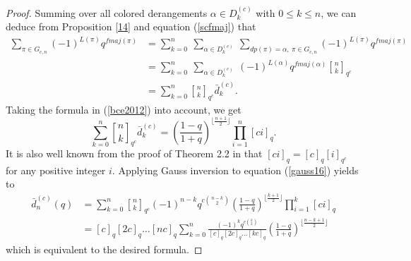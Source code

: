 \documentclass[a4paper,12pt]{article}
\begin{document}
\begin{proof}
Summing over all colored derangements $\alpha \in D_k^{(c)}$ with $0 \leq k \leq n$, we can deduce from Proposition \ref{14} and equation (\ref{scfmaj}) that
\begin{align*}
 \sum_{\pi \in G_{c,n}}(-1)^{L(\pi)}q^{fmaj(\pi)}&=\sum_{k=0}^n~\sum_{\alpha \in D_k^{(c)}}~\sum_{dp(\pi)=\alpha,~\pi \in G_{c,n}}(-1)^{L(\pi)}q^{fmaj(\pi)}\\
&=\sum_{k=0}^n~\sum_{\alpha \in D_k^{(c)}}~(-1)^{L(\alpha)}q^{fmaj(\alpha)} {n \brack k}_{q^c} \\
 &=\sum_{k=0}^n {n \brack k}_{q^c}\bar{d}_{k}^{(c)}.
\end{align*}
Taking the formula in (\ref{bce2012}) into account, we get
\begin{equation}\label{gauss16}
    \sum_{k=0}^n {n \brack k}_{q^c}\bar{d}_{k}^{(c)}=\left( \frac{1-q}{1+q}\right)^{\lfloor{\frac{n+1}{2}}\rfloor} \prod_{i=1}^n [ci]_q.
\end{equation}
It is also well known from the proof of Theorem 2.2 in \cite{ahmia2025} that $[ci]_q=[c]_q[i]_{q^c}$ for any positive integer $i$. Applying Gauss inversion to equation (\ref{gauss16}) yields to 
\begin{align*}
   \bar{d}_{n}^{(c)}(q)&=\sum_{k=0}^n {n \brack k}_{q^c}(-1)^{n-k}q^{c \binom{n-k}{2} }\left( \frac{1-q}{1+q}\right)^{\lfloor{\frac{k+1}{2}}\rfloor} \prod_{i=1}^k [ci]_q\\
   &=[c]_q[2c]_q\dots [nc]_q \sum_{k=0}^n \frac{(-1)^k q^{c \binom{k}{2}}}{[c]_q[2c]_q\dots [kc]_q}\left( \frac{1-q}{1+q}\right)^{\lfloor{\frac{n-k+1}{2}}\rfloor}
\end{align*}
which is equivalent to the desired formula. 
\end{proof}
\end{document}
